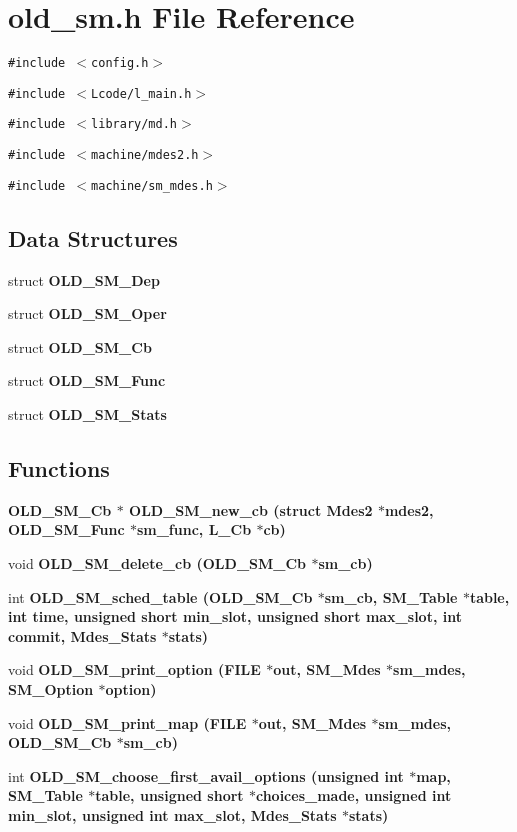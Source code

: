 \section{old\_\-sm.h File Reference}
\label{old__sm_8h}
{\tt \#include $<$config.h$>$}\par
{\tt \#include $<$Lcode/l\_\-main.h$>$}\par
{\tt \#include $<$library/md.h$>$}\par
{\tt \#include $<$machine/mdes2.h$>$}\par
{\tt \#include $<$machine/sm\_\-mdes.h$>$}\par
\subsection*{Data Structures}
\begin{CompactItemize}
\item 
struct \bf{OLD\_\-SM\_\-Dep}
\item 
struct \bf{OLD\_\-SM\_\-Oper}
\item 
struct \bf{OLD\_\-SM\_\-Cb}
\item 
struct \bf{OLD\_\-SM\_\-Func}
\item 
struct \bf{OLD\_\-SM\_\-Stats}
\end{CompactItemize}
\subsection*{Functions}
\begin{CompactItemize}
\item 
\bf{OLD\_\-SM\_\-Cb} $\ast$ \bf{OLD\_\-SM\_\-new\_\-cb} (struct Mdes2 $\ast$mdes2, \bf{OLD\_\-SM\_\-Func} $\ast$sm\_\-func, L\_\-Cb $\ast$cb)
\item 
void \bf{OLD\_\-SM\_\-delete\_\-cb} (\bf{OLD\_\-SM\_\-Cb} $\ast$sm\_\-cb)
\item 
int \bf{OLD\_\-SM\_\-sched\_\-table} (\bf{OLD\_\-SM\_\-Cb} $\ast$sm\_\-cb, SM\_\-Table $\ast$table, int time, unsigned short min\_\-slot, unsigned short max\_\-slot, int commit, Mdes\_\-Stats $\ast$stats)
\item 
void \bf{OLD\_\-SM\_\-print\_\-option} (FILE $\ast$out, SM\_\-Mdes $\ast$sm\_\-mdes, SM\_\-Option $\ast$option)
\item 
void \bf{OLD\_\-SM\_\-print\_\-map} (FILE $\ast$out, SM\_\-Mdes $\ast$sm\_\-mdes, \bf{OLD\_\-SM\_\-Cb} $\ast$sm\_\-cb)
\item 
int \bf{OLD\_\-SM\_\-choose\_\-first\_\-avail\_\-options} (unsigned int $\ast$map, SM\_\-Table $\ast$table, unsigned short $\ast$choices\_\-made, unsigned int min\_\-slot, unsigned int max\_\-slot, Mdes\_\-Stats $\ast$stats)
\end{CompactItemize}


